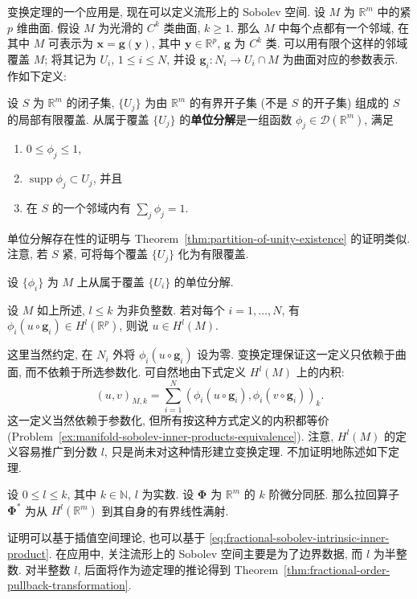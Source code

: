 变换定理的一个应用是, 现在可以定义流形上的 Sobolev 空间. 设 $M$ 为 $\mathbb{R}^m$ 中的紧 $p$ 维曲面. 假设 $M$ 为光滑的 $C^k$ 类曲面, $k\geq1$. 那么 $M$ 中每个点都有一个邻域, 在其中 $M$ 可表示为 $\bm{x}=\bm{g}(\bm{y})$, 其中 $\bm{y}\in\mathbb{R}^p$, $\bm{g}$ 为 $C^k$ 类. 可以用有限个这样的邻域覆盖 $M$; 将其记为 $U_i$, $1\leq i\leq N$, 并设 $\bm{g}_i:N_i\to U_i\cap M$ 为曲面对应的参数表示. 作如下定义:

\begin{Definition}
\label{def:closed-set-partition-of-unity}
设 $S$ 为 $\mathbb{R}^m$ 的闭子集, $\{U_j\}$ 为由 $\mathbb{R}^m$ 的有界开子集 (不是 $S$ 的开子集) 组成的 $S$ 的局部有限覆盖. 从属于覆盖 $\{U_j\}$ 的\textbf{单位分解}是一组函数 $\phi_j\in\mathcal{D}(\mathbb{R}^m)$, 满足\begin{enumerate}
\item $0\leq\phi_j\leq1$,
\item $\operatorname{supp}\phi_j\subset U_j$, 并且
\item 在 $S$ 的一个邻域内有 $\sum_j\phi_j=1$.
\end{enumerate}
\end{Definition}

单位分解存在性的证明与 Theorem~\ref{thm:partition-of-unity-existence} 的证明类似. 注意, 若 $S$ 紧, 可将每个覆盖 $\{U_j\}$ 化为有限覆盖.

设 $\{\phi_i\}$ 为 $M$ 上从属于覆盖 $\{U_i\}$ 的单位分解.

\begin{Definition}
\label{def:manifold-sobolev-spaces}
设 $M$ 如上所述, $l\leq k$ 为非负整数. 若对每个 $i=1,\ldots,N$, 有 $\phi_i(u\circ\bm{g}_i)\in H^l(\mathbb{R}^p)$, 则说 $u\in H^l(M)$.
\end{Definition}

这里当然约定, 在 $N_i$ 外将 $\phi_i(u\circ\bm{g}_i)$ 设为零. 变换定理保证这一定义只依赖于曲面, 而不依赖于所选参数化. 可自然地由下式定义 $H^l(M)$ 上的内积:
\begin{equation}\label{eq:manifold-sobolev-local-inner-product}
(u,v)_{M,k}=\sum_{i=1}^N(\phi_i(u\circ\bm{g}_i),\phi_i(v\circ\bm{g}_i))_k.
\end{equation}
这一定义当然依赖于参数化, 但所有按这种方式定义的内积都等价 (Problem~\ref{ex:manifold-sobolev-inner-products-equivalence}). 注意, $H^l(M)$ 的定义容易推广到分数 $l$, 只是尚未对这种情形建立变换定理. 不加证明地陈述如下定理.

\begin{Theorem}
\label{thm:fractional-order-pullback-transformation}
设 $0\leq l\leq k$, 其中 $k\in\mathbb{N}$, $l$ 为实数. 设 $\bm{\Phi}$ 为 $\mathbb{R}^m$ 的 $k$ 阶微分同胚. 那么拉回算子 $\bm{\Phi}^*$ 为从 $H^l(\mathbb{R}^m)$ 到其自身的有界线性满射.
\end{Theorem}

证明可以基于插值空间理论, 也可以基于 \eqref{eq:fractional-sobolev-intrinsic-inner-product}. 在应用中, 关注流形上的 Sobolev 空间主要是为了边界数据, 而 $l$ 为半整数. 对半整数 $l$, 后面将作为迹定理的推论得到 Theorem~\ref{thm:fractional-order-pullback-transformation}.
